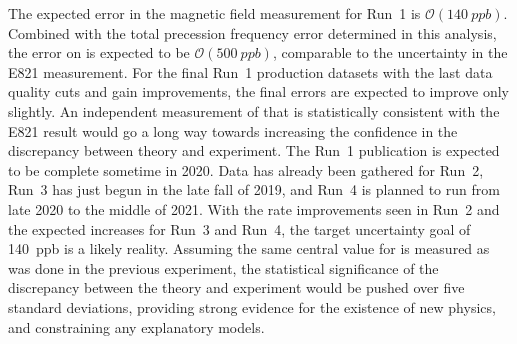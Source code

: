 The expected error in the magnetic field measurement for Run~1 is $\mathcal{O}(\SI{140}{ppb})$. Combined with the total precession frequency error determined in this analysis, the error on \amu is expected to be $\mathcal{O}(\SI{500}{ppb})$, comparable to the uncertainty in the E821 measurement. For the final Run~1 production datasets with the last data quality cuts and gain improvements, the final errors are expected to improve only slightly. An independent measurement of \amu that is statistically consistent with the E821 result would go a long way towards increasing the confidence in the discrepancy between theory and experiment. The Run~1 publication is expected to be complete sometime in 2020. Data has already been gathered for Run~2, Run~3 has just begun in the late fall of 2019, and Run~4 is planned to run from late 2020 to the middle of 2021. With the rate improvements seen in Run~2 and the expected increases for Run~3 and Run~4, the target uncertainty goal of \SI{140}{ppb} is a likely reality. Assuming the same central value for \amu is measured as was done in the previous experiment, the statistical significance of the discrepancy between the theory and experiment would be pushed over five standard deviations, providing strong evidence for the existence of new physics, and constraining any explanatory models.







